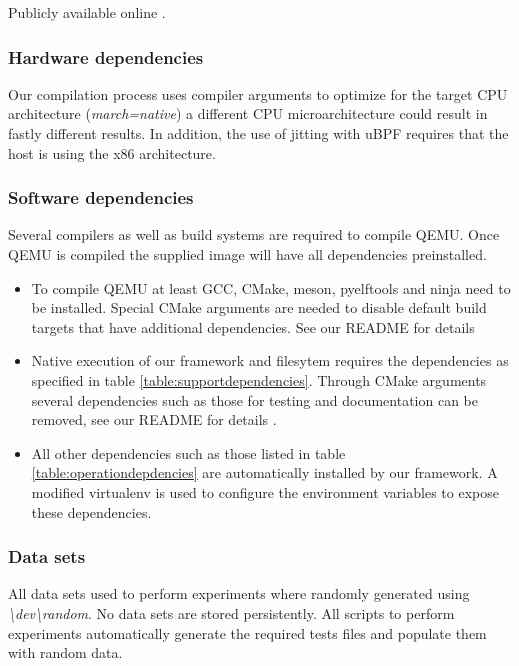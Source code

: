 Publicly available online \cite{qemu-csd}.

\subsubsection*{Hardware dependencies}

Our compilation process uses compiler arguments to optimize for the target CPU
architecture (\textit{march=native}) a different CPU microarchitecture could
result in fastly different results. In addition, the use of jitting with uBPF
requires that the host is using the x86 architecture.

\subsubsection*{Software dependencies}

Several compilers as well as build systems are required to compile QEMU. Once
QEMU is compiled the supplied image will have all dependencies preinstalled.

\begin{itemize}
    \item To compile QEMU at least GCC, CMake, meson, pyelftools and ninja need
    to be installed. Special CMake arguments are needed to disable default build
    targets that have additional dependencies. See our README for details
    \cite{qemu-csd}
    \item Native execution of our framework and filesytem requires the
    dependencies as specified in table \ref{table:supportdependencies}.
    Through CMake arguments several dependencies such as those for testing and
    documentation can be removed, see our README for details \cite{qemu-csd}.
    \item All other dependencies such as those listed in table
    \ref{table:operationdepdencies} are automatically installed by our
    framework. A modified virtualenv is used to configure the environment
    variables to expose these dependencies.
\end{itemize}

\subsubsection*{Data sets}

All data sets used to perform experiments where randomly generated using
\textit{\textbackslash dev\textbackslash random}. No data sets are stored
persistently. All scripts to perform experiments automatically generate the
required tests files and populate them with random data.

